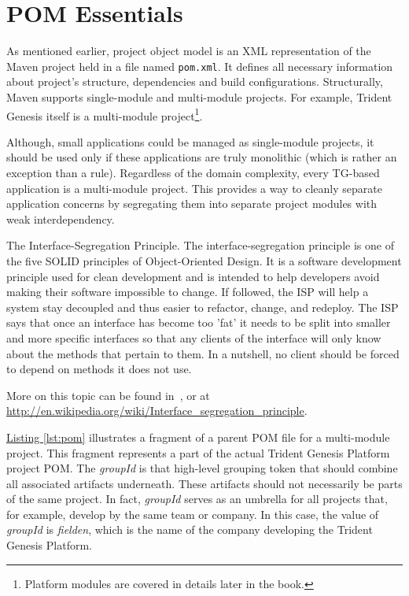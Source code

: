   \section{POM Essentials}

  As mentioned earlier, project object model is an XML representation of the Maven project held in a file named \texttt{pom.xml}. 
  It defines all necessary information about project's structure, dependencies and build configurations.
  Structurally, Maven supports single-module and multi-module projects.
  For example, Trident Genesis itself is a multi-module project\footnote{Platform modules are covered in details later in the book.}.

  Although, small applications could be managed as single-module projects, it should be used only if these applications are truly monolithic (which is rather an exception than a rule).  
  Regardless of the domain complexity, every TG-based application is a multi-module project.
  This provides a way to cleanly separate application concerns by segregating them into separate project modules with weak interdependency.
  
  \begin{notebox}{The Interface-Segregation Principle.}{\label{mb:segregation}}
    The interface-segregation principle is one of the five SOLID principles of Object-Oriented Design.
    It is a software development principle used for clean development and is intended to help developers avoid making their software impossible to change. 
    If followed, the ISP will help a system stay decoupled and thus easier to refactor, change, and redeploy. 
    The ISP says that once an interface has become too 'fat' it needs to be split into smaller and more specific interfaces so that any clients of the interface will only know about the methods that pertain to them. In a nutshell, no client should be forced to depend on methods it does not use.

    More on this topic can be found in~\cite{Martin2002}, or at \url{http://en.wikipedia.org/wiki/Interface_segregation_principle}.
  \end{notebox}   

  \hyperref[lst:pom]{Listing \ref{lst:pom}} illustrates a fragment of a parent POM file for a multi-module project.
  This fragment represents a part of the actual Trident Genesis Platform project POM.
  The \emph{groupId} is that high-level grouping token that should combine all associated artifacts underneath.
  These artifacts should not necessarily be parts of the same project.
  In fact, \emph{groupId} serves as an umbrella for all projects that, for example, develop by the same team or company.
  In this case, the value of \emph{groupId} is \emph{fielden}, which is the name of the company developing the Trident Genesis Platform.
  
